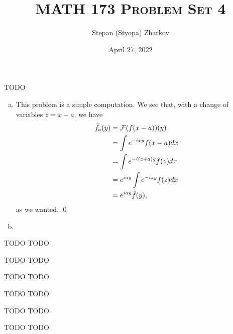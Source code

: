 \documentclass{article}
\title{\textsc{MATH 173 Problem Set 4}}
\author{Stepan (Styopa) Zharkov}
\date{April 27, 2022}
\begin{document}
\maketitle
{} TODO  \tri
\hop 
\solution
\begin{enumerate}[(a)]
    \item This problem is a simple computation. We see that, with a change of variables $z = x-a$, we have
    \begin{align*}
        \hat{f_a}(y) &= \cal{F}(f(x-a))(y) \\
        &= \int e^{-ixy}f(x-a)dx \\
        &= \int e^{-i(z+a)y}f(z)dx \\
        &= e^{iay}\int e^{-izy}f(z)dx \\
        &= e^{iay}\hat{f}(y),
    \end{align*}
    as we wanted. \qed
    \item 
\end{enumerate}


\newpage
{} TODO  \tri
\hop 
\solution
TODO


\newpage
{} TODO  \tri
\hop 
\solution
TODO


\newpage
{} TODO  \tri
\hop 
\solution
TODO


\newpage
{} TODO  \tri
\hop 
\solution
TODO


\newpage
{} TODO  \tri
\hop 
\solution
TODO


\newpage
{} TODO  \tri
\hop 
\solution
TODO
\end{document}
